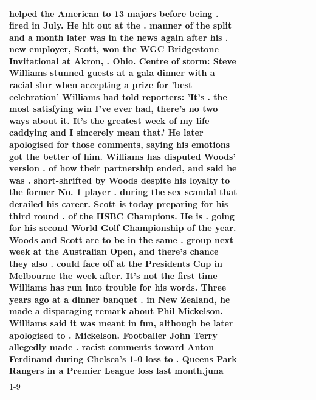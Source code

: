 \begin{table}[H]
\begin{tabular}{lllrlllll}
helped the American to 13 majors before being . fired in July. He hit out at the . manner of the split and a month later was in the news again after his . new employer, Scott, won the WGC Bridgestone Invitational at Akron, . Ohio. Centre of storm: Steve Williams stunned guests at a gala dinner with a racial slur when accepting a prize for 'best celebration' Williams had told reporters: 'It's . the most satisfying win I've ever had, there's no two ways about it. It's the greatest week of my life caddying and I sincerely mean that.' He later apologised for those comments, saying his emotions got the better of him. Williams has disputed Woods' version . of how their partnership ended, and said he was . short-shrifted by Woods despite his loyalty to the former No. 1 player . during the sex scandal that derailed his career. Scott is today preparing for his third round . of the HSBC Champions. He is . going for his second World Golf Championship of the year. Woods and Scott are to be in the same . group next week at the Australian Open, and there's chance they also . could face off at the Presidents Cup in Melbourne the week after. It's not the first time Williams has run into trouble for his words. Three years ago at a dinner banquet . in New Zealand, he made a disparaging remark about Phil Mickelson. Williams said it was meant in fun, although he later apologised to . Mickelson. Footballer John Terry allegedly made . racist comments toward Anton Ferdinand during Chelsea's 1-0 loss to . Queens Park Rangers in a Premier League loss last month.juna \\
\cline{1-9}

\end{tabular}
\end{table}
